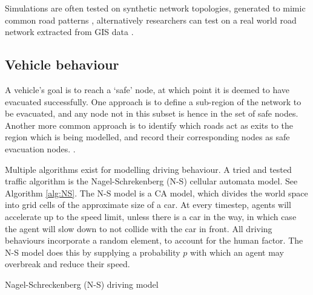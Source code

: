 Simulations are often tested on synthetic network topologies, generated to mimic common road patterns \cite{Zhang2009Agent-basedEvacuation}, alternatively researchers can test on a real world road network extracted from GIS data \cite{Chen2006Agent-BasedKeys}.

\subsection{Vehicle behaviour}
A vehicle's goal is to reach a `safe' node, at which point it is deemed to have evacuated successfully. One approach is to define a sub-region of the network to be evacuated, and any node not in this subset is hence in the set of safe nodes. \cite{Chen2008Agent-basedStrategies} Another more common approach is to identify which roads act as exits to the region which is being modelled, and record their corresponding nodes as safe evacuation nodes. \cite{Madireddy2011AnManagement,Dawson2011AnManagement}.

Multiple algorithms exist for modelling driving behaviour. A tried and tested traffic algorithm is the Nagel-Schrekenberg (N-S) cellular automata model\cite{Nagel1992ATraffic,Nagel1998Two-laneApproach}. See Algorithm \ref{alg:NS}. The N-S model is a CA model, which divides the world space into grid cells of the approximate size of a car. At every timestep, agents will accelerate up to the speed limit, unless there is a car in the way, in which case the agent will slow down to not collide with the car in front. All driving behaviours incorporate a random element, to account for the human factor. The N-S model does this by supplying a probability $p$ with which an agent may overbreak and reduce their speed.

\begin{algorithm}
    
    
    
    \caption{Nagel-Schreckenberg (N-S) driving model}
    \label{alg:NS}
\end{algorithm}

